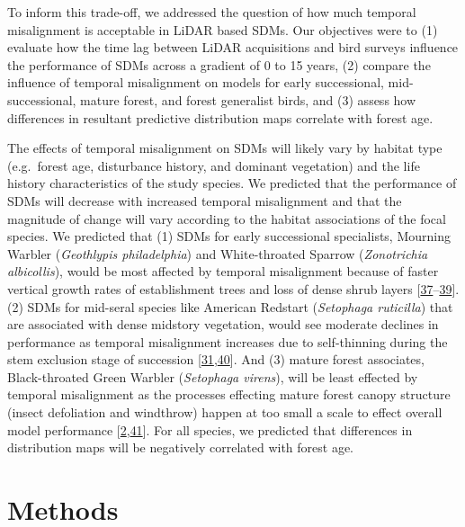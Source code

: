 \documentclass[manuscript, 3p, authoryear]{elsarticle} %
\begin{document}
To inform this trade-off, we addressed the question of how much temporal misalignment is acceptable in LiDAR based SDMs. Our objectives were to (1) evaluate how the time lag between LiDAR acquisitions and bird surveys influence the performance of SDMs across a gradient of 0 to 15 years, (2) compare the influence of temporal misalignment on models for early successional, mid-successional, mature forest, and forest generalist birds, and (3) assess how differences in resultant predictive distribution maps correlate with forest age.

The effects of temporal misalignment on SDMs will likely vary by habitat type (e.g.~forest age, disturbance history, and dominant vegetation) and the life history characteristics of the study species. We predicted that the performance of SDMs will decrease with increased temporal misalignment and that the magnitude of change will vary according to the habitat associations of the focal species. We predicted that (1) SDMs for early successional specialists, Mourning Warbler (\emph{Geothlypis philadelphia}) and White-throated Sparrow (\emph{Zonotrichia albicollis}), would be most affected by temporal misalignment because of faster vertical growth rates of establishment trees and loss of dense shrub layers {[}\protect\hyperlink{ref-mccarthy2001gap}{37}--\protect\hyperlink{ref-pitocchelliMourningWarblerGeothlypis2020}{39}{]}. (2) SDMs for mid-seral species like American Redstart (\emph{Setophaga ruticilla}) that are associated with dense midstory vegetation, would see moderate declines in performance as temporal misalignment increases due to self-thinning during the stem exclusion stage of succession {[}\protect\hyperlink{ref-brassardStandStructureComposition2010}{31},\protect\hyperlink{ref-sherryAmericanRedstartSetophaga2020a}{40}{]}. And (3) mature forest associates, Black-throated Green Warbler (\emph{Setophaga virens}), will be least effected by temporal misalignment as the processes effecting mature forest canopy structure (insect defoliation and windthrow) happen at too small a scale to effect overall model performance {[}\protect\hyperlink{ref-VierlingSwift2014}{2},\protect\hyperlink{ref-morseBlackthroatedGreenWarbler2020}{41}{]}. For all species, we predicted that differences in distribution maps will be negatively correlated with forest age.

\hypertarget{methods}{%
\section{Methods}\label{methods}}
\end{document}
